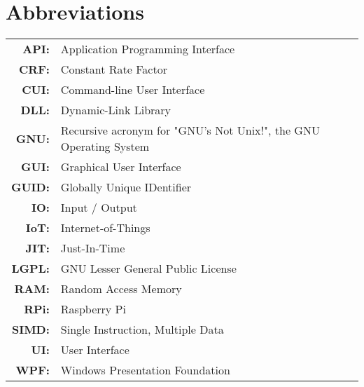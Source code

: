 \renewcommand{\baselinestretch}{1}
\chapter{Abbreviations}

\begin{tabular}{rl}
  \vspace{0.1em} \textbf{API:} & Application Programming Interface \\
  \vspace{0.1em} \textbf{CRF:} & Constant Rate Factor \\
  \vspace{0.1em} \textbf{CUI:} & Command-line User Interface \\
  \vspace{0.1em} \textbf{DLL:} & Dynamic-Link Library \\
  \vspace{0.1em} \textbf{GNU:} & Recursive acronym for "GNU's Not Unix!", the GNU Operating System \\
  \vspace{0.1em} \textbf{GUI:} & Graphical User Interface \\
  \vspace{0.1em} \textbf{GUID:} & Globally Unique IDentifier \\
  \vspace{0.1em} \textbf{IO:} & Input / Output \\
  \vspace{0.1em} \textbf{IoT:} & Internet-of-Things \\
  \vspace{0.1em} \textbf{JIT:} & Just-In-Time \\
  \vspace{0.1em} \textbf{LGPL:} & GNU Lesser General Public License \\
  \vspace{0.1em} \textbf{RAM:} & Random Access Memory \\
  \vspace{0.1em} \textbf{RPi:} & Raspberry Pi \\
  \vspace{0.1em} \textbf{SIMD:} & Single Instruction, Multiple Data \\
  \vspace{0.1em} \textbf{UI:} & User Interface \\
  \vspace{0.1em} \textbf{WPF:} & Windows Presentation Foundation \\
\end{tabular}

